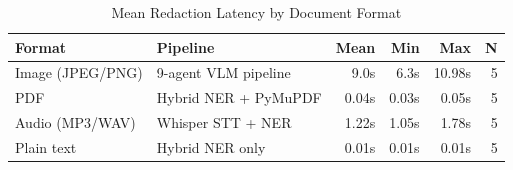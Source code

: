 \begin{table}[h]\centering
\caption{Mean Redaction Latency by Document Format}
\label{tab:latency}
\begin{tabular}{llrrrr}
\toprule
Format & Pipeline & Mean & Min & Max & N \\
\midrule
Image (JPEG/PNG) & 9-agent VLM pipeline & 9.0s & 6.3s & 10.98s & 5 \\
PDF & Hybrid NER + PyMuPDF & 0.04s & 0.03s & 0.05s & 5 \\
Audio (MP3/WAV) & Whisper STT + NER & 1.22s & 1.05s & 1.78s & 5 \\
Plain text & Hybrid NER only & 0.01s & 0.01s & 0.01s & 5 \\
\bottomrule
\end{tabular}
\end{table}